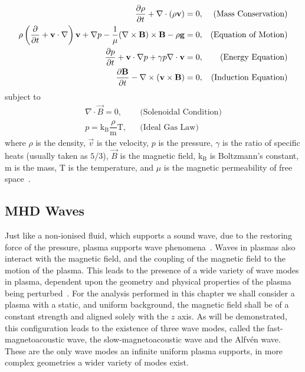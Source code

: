 \begin{align}                                                  
    \dfrac{\partial \rho }{\partial t} + \nabla \cdot (\rho \mathbf{v}) = 0,
    &&\text{(Mass Conservation)}\label{eq:imhd_mass}\\
    \rho  \left(\frac{\partial}{\partial t} + \mathbf{v}\cdot\nabla\right)\mathbf{v} + \nabla p - \dfrac{1}{\mu}(\nabla \times \mathbf{B}) \times \mathbf{B} - \rho \mathbf{g} = 0,
    &&\text{(Equation of Motion)}\label{eq:imhd_motion}\\
    \frac{\partial p}{\partial t} + \mathbf{v}\cdot\nabla p + \gamma p \nabla \cdot \mathbf{v}  = 0,
    &&\text{(Energy Equation)}\label{eq:imhd_equation}\\
    \dfrac{\partial \mathbf{B}}{\partial t} - \nabla \times (\mathbf{v} \times \mathbf{B}) = 0,
    &&\text{(Induction Equation)}\label{eq:imhd_induction}
\end{align}
subject to
\begin{align}
    \nabla \cdot \vec{B} = 0,
    &&\text{(Solenoidal Condition)}\\
    p = \mathrm{k_B} \dfrac{\rho}{\mathrm{m}} \mathrm{T},
    &&\text{(Ideal Gas Law)}                    
\end{align}
where $\rho$ is the density, $\vec{v}$ is the velocity, $p$ is the pressure, $\gamma$ is the ratio of specific heats (usually taken as $5/3$), $\vec{B}$ is the magnetic field, $\mathrm{k_B}$ is Boltzmann's constant, $\mathrm{m}$ is the mass, $\mathrm{T}$ is the temperature, and $\mu$ is the magnetic permeability of free space~\citep{goedbloed2004}.


\subsection{MHD Waves}\label{sec:MHDwaves}
Just like a non-ionised fluid, which supports a sound wave, due to the restoring force of the pressure, plasma supports wave phenomena~\citep{alfven1942}.
Waves in plasmas also interact with the magnetic field, and the coupling of the magnetic field to the motion of the plasma.
This leads to the presence of a wide variety of wave modes in plasma, dependent upon the geometry and physical properties of the plasma being perturbed~\citep{jess2015}.
For the analysis performed in this chapter we shall consider a plasma with a static, and uniform background, the magnetic field shall be of a constant strength and aligned solely with the $z$ axis.
As will be demonstrated, this configuration leads to the existence of three wave modes, called the fast-magnetoacoustic wave, the slow-magnetoacoustic wave and the Alfv\'en wave.
These are the only wave modes an infinite uniform plasma supports, in more complex geometries a wider variety of modes exist.

